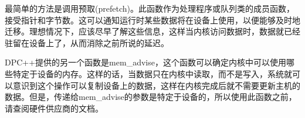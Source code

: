 最简单的方法是调用预取(prefetch)。此函数作为处理程序或队列类的成员函数，接受指针和字节数。这可以通知运行时某些数据将在设备上使用，以便能够及时地迁移。理想情况下，应该尽早了解这些信息，这样当内核访问数据时，数据就已经驻留在设备上了，从而消除之前所说的延迟。\par

DPC++提供的另一个函数是mem\_advise，这个函数可以确定内核中可以使用哪些特定于设备的内存。这样的话，当数据只在内核中读取，而不是写入，系统就可以意识到这个操作可以复制设备上的数据，这样在内核完成后就不需要更新主机的数据。但是，传递给mem\_advise的参数是特定于设备的，所以使用此函数之前，请查阅硬件供应商的文档。\par
















